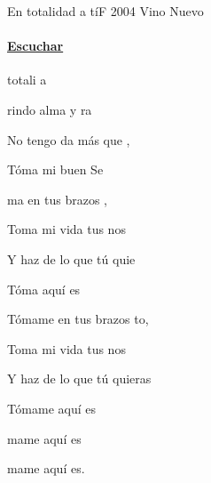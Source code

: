 \documentclass[12pt, spanish]{book}
\begin{document}
    \begin{song}{En totalidad a tí}{F}
    {2004} %
    {Vino Nuevo}
    {} %
    {}
        \ifChordBk
            \paragraph{\mbox{}\hfill\protect\href{https://open.spotify.com/intl-es/track/5W3PrDRuoXfDyolUWkwLzy}{Escuchar}\mbox{}\hfill}
        \fi


        \begin{SBOpGroup}
             totali a 

            rindo alma y ra

            No tengo da más que ,

            Tóma mi buen Se
        \end{SBOpGroup}

        \begin{SBChorus}
            ma en tus brazos ,

            Toma mi vida  tus nos

            Y haz de  lo que tú quie

            Tóma aquí es
        \end{SBChorus}


        \begin{SBOpGroup}
            Tómame en tus brazos to,

            Toma mi vida  tus nos

            Y haz de  lo que tú quieras

            Tómame aquí es
        \end{SBOpGroup}

        \begin{SBOpGroup}
            mame aquí es

            mame aquí es.
        \end{SBOpGroup}


\end{song}
\end{document}
